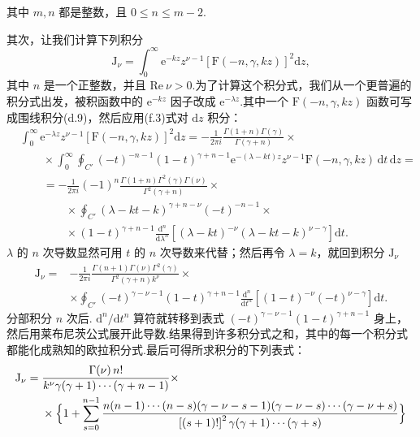 其中 $m,n$ 都是整数，且 $0\leqslant n\leqslant m-2$.

其次，让我们计算下列积分
\begin{equation}
  \mathrm{J}_{\nu}=\int_0^{\infty}\mathrm{e}^{-kz}z^{\nu-1}
  \left[\mathrm{F}(-n,\gamma,kz)\right]^2\mathrm{d}z,
\end{equation}
其中 $n$ 是一个正整数，并且 $\mathrm{Re}\ \nu>0$.为了计算这个积分式，我们从一个更普遍的积分式出发，被积函数中的 $\mathrm{e}^{-kz}$ 因子改成 $\mathrm{e}^{-\lambda z}$.其中一个 $\mathrm{F}(-n,\gamma,kz)$ 函数可写成围线积分(d.9)，然后应用(f.3)式对 $\mathrm{d}z$ 积分：
\begin{equation*}
\begin{aligned}
  &\int_0^{\infty}\mathrm{e}^{-\lambda z}z^{\nu-1}
  \left[\mathrm{F}(-n,\gamma,kz)\right]^2\mathrm{d}z
  =-\frac{1}{2\pi i}\frac{\Gamma(1+n)\Gamma(\gamma)}{\Gamma(\gamma+n)}\times\\
  &\qquad\times\int_0^{\infty}\oint_{C'}(-t)^{-n-1}(1-t)^{\gamma+n-1}
  \mathrm{e}^{-(\lambda-kt)z}z^{\nu-1}\mathrm{F}(-n,\gamma,kz)\,\mathrm{d}t\,\mathrm{d}z=\\
  &\qquad=-\frac{1}{2\pi i}(-1)^n
  \frac{\Gamma(1+n)\Gamma^2(\gamma)\Gamma(\nu)}{\Gamma^2(\gamma+n)}\times\\
  &\qquad\qquad\times\oint_{C'}(\lambda-kt-k)^{\gamma+n-\nu}(-t)^{-n-1}\times\\
  &\qquad\qquad\times(1-t)^{\gamma+n-1}
  \frac{\mathrm{d}^n}{\mathrm{d}\lambda^n}
  \left[(\lambda-kt)^{-\nu}(\lambda-kt-k)^{\nu-\gamma}\right]\mathrm{d}t.
\end{aligned}
\end{equation*}
$\lambda$ 的 $n$ 次导数显然可用 $t$ 的 $n$ 次导数来代替；然后再令 $\lambda=k$，就回到积分 $\mathrm{J}_{\nu}$
\begin{equation*}
\begin{aligned}
  \mathrm{J}_{\nu}={}&-\frac{1}{2\pi i}
  \frac{\Gamma(n+1)\Gamma(\nu)\Gamma^2(\gamma)}{\Gamma^2(\gamma+n)k^{\nu}}\times\\
  &\times\oint_{C'}(-t)^{\gamma-\nu-1}(1-t)^{\gamma+n-1}
  \frac{\mathrm{d}^n}{\mathrm{d}t^n}
  \left[(1-t)^{-\nu}(-t)^{\nu-\gamma}\right]\mathrm{d}t.
\end{aligned}
\end{equation*}
分部积分 $n$ 次后. $\mathrm{d}^n/\mathrm{d}t^n$ 算符就转移到表式 $(-t)^{\gamma-\nu-1}(1-t)^{\gamma+n-1}$ 身上，然后用莱布尼茨公式展开此导数.结果得到许多积分式之和，其中的每一个积分式都能化成熟知的欧拉积分式.最后可得所求积分的下列表式：
\begin{equation}
\begin{aligned}
  \mathrm{J}_{\nu}={}&\frac{\Gamma(\nu)\,n!}
  {k^{\nu}\gamma(\gamma+1)\cdots(\gamma+n-1)}\times\\
  &\times\Bigl\{1+\sum_{s=0}^{n-1}
  \frac{n(n-1)\cdots(n-s)(\gamma-\nu-s-1)(\gamma-\nu-s)\cdots(\gamma-\nu+s)}
  {\left[(s+1)!\right]^2\gamma(\gamma+1)\cdots(\gamma+s)}\Bigr\}
\end{aligned}
\end{equation}
